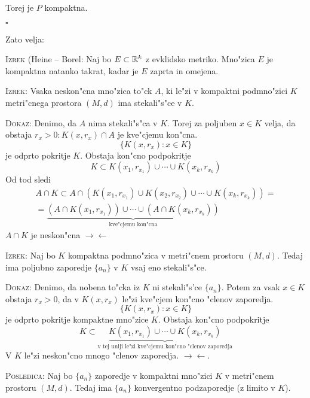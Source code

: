 Torej je $P$ kompaktna.

\hfill $\square$

Zato velja:

\textsc{Izrek} (Heine -- Borel: Naj bo $E \subset \mathbb{R}^k$ z evklidsko metriko. Mno"zica $E$ je kompaktna natanko takrat, kadar je $E$ zaprta in omejena.

\textsc{Izrek:} Vsaka neskon"cna mno"zica to"ck $A$, ki le"zi v kompaktni podmno"zici $K$ metri"cnega prostora $(M, d)$ ima stekali"s"ce v $K$.

\textsc{Dokaz:} Denimo, da $A$ nima stekali"s"ca v $K$. Torej za poljuben $x \in K$ velja, da obstaja $r_x > 0: K(x, r_x) \cap A$ je kve"cjemu kon"cna.
\begin{equation*}
\{ K(x, r_x): x \in K \}
\end{equation*}
je odprto pokritje $K$. Obstaja kon"cno podpokritje
\begin{equation*}
K \subset K(x_1, r_{x_1}) \cup \cdots \cup K(x_k, r_{x_k})
\end{equation*}
Od tod sledi
\begin{multline*}
A \cap K \subset A \cap (K(x_1, r_{x_1}) \cup K(x_2, r_{x_2}) \cup \cdots \cup K(x_k, r_{x_k})) = \\
= \underbrace{(A \cap K(x_1, r_{x_1})) \cup \cdots \cup (A \cap K(x_k, r_{x_k}))}_\text{kve"cjemu kon"cna}
\end{multline*}
$A \cap K$ je neskon"cna $\rightarrow \leftarrow$

\textsc{Izrek:} Naj bo $K$ kompaktna podmno"zica v metri"cnem prostoru $(M, d)$. Tedaj ima poljubno zaporedje $\{ a_n \}$ v $K$ vsaj eno stekali"s"ce.

\textsc{Dokaz:} Denimo, da nobena to"cka iz $K$ ni stekali"s'ce $\{ a_n \}$. Potem za vsak $x \in K$ obstaja $r_x > 0$, da v $K(x, r_x)$ le"zi kve"cjem kon"cno "clenov zaporedja.
\begin{equation*}
\{ K(x, r_x): x \in K \}
\end{equation*}
je odprto pokritje kompaktne mno"zice $K$. Obstaja kon"cno podpokritje
\begin{equation*}
K \subset \underbrace{K(x_1, r_{x_1}) \cup \cdots \cup K(x_k, r_{x_k})}_\text{v tej uniji le"zi kve"cjemu kon"cno "clenov zaporedja}
\end{equation*}
V $K$ le"zi neskon"cno mnogo "clenov zaporedja. $\rightarrow \leftarrow$.

\textsc{Posledica:} Naj bo $\{ a_n \}$ zaporedje v kompaktni mno"zici $K$ v metri"cnem prostoru $(M, d)$. Tedaj ima $\{ a_n \}$ konvergentno podzaporedje (z limito v $K$).


